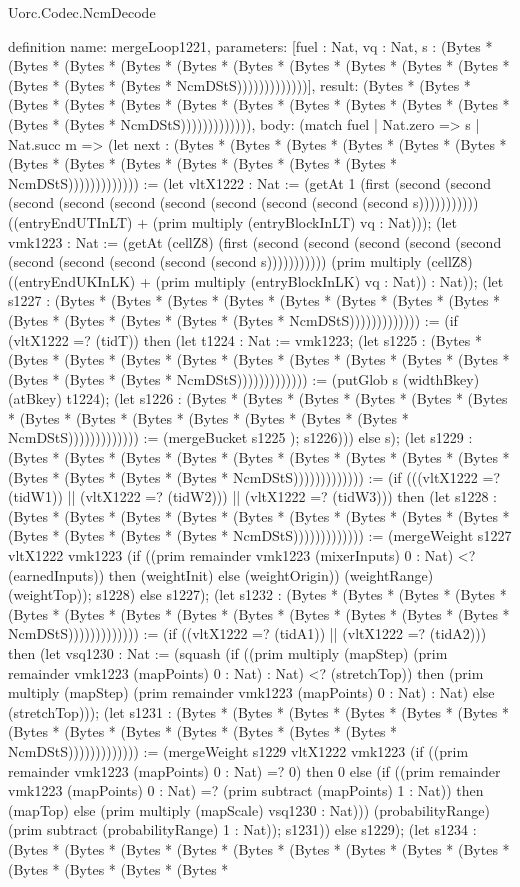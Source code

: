 \begin{lexlean}{Uorc.Codec.NcmDecode}
\begin{semanticmodule}
definition{
  name: mergeLoop1221,
  parameters: [fuel : Nat, vq : Nat, s : (Bytes * (Bytes * (Bytes * (Bytes * (Bytes * (Bytes * (Bytes * (Bytes * (Bytes * (Bytes * (Bytes * (Bytes * (Bytes * NcmDStS)))))))))))))],
  result: (Bytes * (Bytes * (Bytes * (Bytes * (Bytes * (Bytes * (Bytes * (Bytes * (Bytes * (Bytes * (Bytes * (Bytes * (Bytes * NcmDStS))))))))))))),
  body: (match fuel
    | Nat.zero => s
    | Nat.succ m => (let next : (Bytes * (Bytes * (Bytes * (Bytes * (Bytes * (Bytes * (Bytes * (Bytes * (Bytes * (Bytes * (Bytes * (Bytes * (Bytes * NcmDStS))))))))))))) := (let vltX1222 : Nat := (getAt 1 (first (second (second (second (second (second (second (second (second (second (second s))))))))))) ((entryEndUTInLT) + (prim multiply (entryBlockInLT) vq : Nat))); (let vmk1223 : Nat := (getAt (cellZ8) (first (second (second (second (second (second (second (second (second (second (second s))))))))))) (prim multiply (cellZ8) ((entryEndUKInLK) + (prim multiply (entryBlockInLK) vq : Nat)) : Nat)); (let s1227 : (Bytes * (Bytes * (Bytes * (Bytes * (Bytes * (Bytes * (Bytes * (Bytes * (Bytes * (Bytes * (Bytes * (Bytes * (Bytes * NcmDStS))))))))))))) := (if (vltX1222 =? (tidT)) then (let t1224 : Nat := vmk1223; (let s1225 : (Bytes * (Bytes * (Bytes * (Bytes * (Bytes * (Bytes * (Bytes * (Bytes * (Bytes * (Bytes * (Bytes * (Bytes * (Bytes * NcmDStS))))))))))))) := (putGlob s (widthBkey) (atBkey) t1224); (let s1226 : (Bytes * (Bytes * (Bytes * (Bytes * (Bytes * (Bytes * (Bytes * (Bytes * (Bytes * (Bytes * (Bytes * (Bytes * (Bytes * NcmDStS))))))))))))) := (mergeBucket s1225 ); s1226))) else s); (let s1229 : (Bytes * (Bytes * (Bytes * (Bytes * (Bytes * (Bytes * (Bytes * (Bytes * (Bytes * (Bytes * (Bytes * (Bytes * (Bytes * NcmDStS))))))))))))) := (if (((vltX1222 =? (tidW1)) || (vltX1222 =? (tidW2))) || (vltX1222 =? (tidW3))) then (let s1228 : (Bytes * (Bytes * (Bytes * (Bytes * (Bytes * (Bytes * (Bytes * (Bytes * (Bytes * (Bytes * (Bytes * (Bytes * (Bytes * NcmDStS))))))))))))) := (mergeWeight s1227 vltX1222 vmk1223 (if ((prim remainder vmk1223 (mixerInputs) 0 : Nat) <? (earnedInputs)) then (weightInit) else (weightOrigin)) (weightRange) (weightTop)); s1228) else s1227); (let s1232 : (Bytes * (Bytes * (Bytes * (Bytes * (Bytes * (Bytes * (Bytes * (Bytes * (Bytes * (Bytes * (Bytes * (Bytes * (Bytes * NcmDStS))))))))))))) := (if ((vltX1222 =? (tidA1)) || (vltX1222 =? (tidA2))) then (let vsq1230 : Nat := (squash (if ((prim multiply (mapStep) (prim remainder vmk1223 (mapPoints) 0 : Nat) : Nat) <? (stretchTop)) then (prim multiply (mapStep) (prim remainder vmk1223 (mapPoints) 0 : Nat) : Nat) else (stretchTop))); (let s1231 : (Bytes * (Bytes * (Bytes * (Bytes * (Bytes * (Bytes * (Bytes * (Bytes * (Bytes * (Bytes * (Bytes * (Bytes * (Bytes * NcmDStS))))))))))))) := (mergeWeight s1229 vltX1222 vmk1223 (if ((prim remainder vmk1223 (mapPoints) 0 : Nat) =? 0) then 0 else (if ((prim remainder vmk1223 (mapPoints) 0 : Nat) =? (prim subtract (mapPoints) 1 : Nat)) then (mapTop) else (prim multiply (mapScale) vsq1230 : Nat))) (probabilityRange) (prim subtract (probabilityRange) 1 : Nat)); s1231)) else s1229); (let s1234 : (Bytes * (Bytes * (Bytes * (Bytes * (Bytes * (Bytes * (Bytes * (Bytes * (Bytes * (Bytes * (Bytes * (Bytes * (Bytes * }
\end{semanticmodule}
\end{lexlean}
